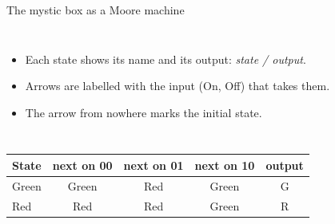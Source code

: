 \documentclass[10pt]{wosm-slides}
\begin{document}
\begin{frame}{The mystic box as a Moore machine}
  \begin{columns}[c, totalwidth=\textwidth]
      \centering
      \begin{itemize}
        \item Each state shows its name and its output: \emph{state / output}.
        \item Arrows are labelled with the input (On, Off) that takes them.
        \item The arrow from nowhere marks the initial state.
      \end{itemize}
  \end{columns}

  \bigskip
  \begin{center}
    \small
    \begin{tabular}{@{}l|ccc|c@{}}
      \toprule
      State & next on 00 & next on 01 & next on 10 & output \\
      \midrule
      Green & Green & Red & Green & G \\
      Red & Red & Red & Green & R \\
      \bottomrule
    \end{tabular}
  \end{center}
\end{frame}
\end{document}
